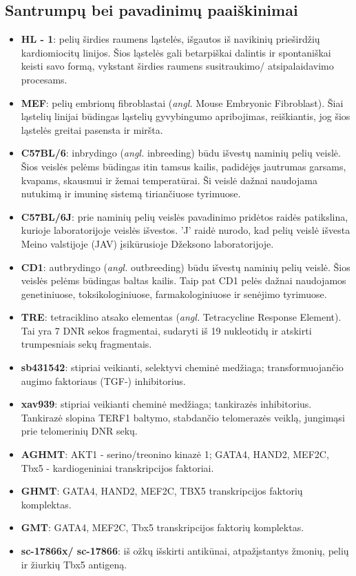 \documentclass[12pt]{article}
\begin{document}
\newpage

\subsection{Santrumpų bei pavadinimų paaiškinimai}
\begin{itemize}
    \item \textbf{HL - 1}: pelių širdies raumens ląstelės, išgautos iš
          navikinių prieširdžių kardiomiocitų linijos. Šios ląstelės gali
          betarpiškai dalintis ir spontaniškai keisti savo formą, vykstant
          širdies raumens susitraukimo/ atsipalaidavimo procesams.
    \item \textbf{MEF}: pelių embrionų fibroblastai (\emph{angl.} Mouse
          Embryonic Fibroblast). Šiai ląstelių linijai būdingas ląstelių
          gyvybingumo apribojimas, reiškiantis, jog šios ląstelės greitai
          pasensta ir miršta.
    \item \textbf{C57BL/6}: inbrydingo (\emph{angl.} inbreeding) būdu išvestų
          naminių pelių veislė. Šios veislės pelėms būdingas itin tamsus
          kailis, padidėjęs jautrumas garsams, kvapams, skausmui ir žemai
          temperatūrai. Ši veislė dažnai naudojama nutukimą ir imuninę sistemą
          tiriančiuose tyrimuose.
    \item \textbf{C57BL/6J}: prie naminių pelių veislės pavadinimo pridėtos
          raidės patikslina, kurioje laboratorijoje veislės išvestos. 'J' raidė
          nurodo, kad pelių veislė išvesta Meino valstijoje (JAV) įsikūrusioje
          Džeksono laboratorijoje\cite{JCKSLAB}.
    \item \textbf{CD1}: autbrydingo (\emph{angl.} outbreeding) būdu išvestų
          naminių pelių veislė. Šios veislės pelėms būdingas baltas kailis.
          Taip pat CD1 pelės dažnai naudojamos genetiniuose, toksikologiniuose,
          farmakologiniuose ir senėjimo tyrimuose.
    \item \textbf{TRE}: tetraciklino atsako elementas (\emph{angl.} 
          Tetracycline Response Element). Tai yra 7 DNR sekos fragmentai,
          sudaryti iš 19 nukleotidų ir atskirti trumpesniais sekų fragmentais.
    \item \textbf{sb431542}: stipriai veikianti, selektyvi cheminė medžiaga;
          transformuojančio augimo faktoriaus {\textbeta} (TGF-{\textbeta})
          inhibitorius.
    \item \textbf{xav939}: stipriai veikianti cheminė medžiaga; tankirazės
          inhibitorius. Tankirazė slopina TERF1 baltymo, stabdančio
          telomerazės veiklą, jungimąsi prie telomerinių DNR sekų.
    \item \textbf{AGHMT}: AKT1 - serino/treonino kinazė 1; GATA4, HAND2, MEF2C,
          Tbx5 - kardiogeniniai transkripcijos faktoriai.
    \item \textbf{GHMT}: GATA4, HAND2, MEF2C, TBX5 transkripcijos faktorių
          komplektas.
    \item \textbf{GMT}: GATA4, MEF2C, Tbx5 transkripcijos faktorių komplektas.
    \item \textbf{sc-17866x/ sc-17866}: iš ožkų išskirti antikūnai,
          atpažįstantys žmonių, pelių ir žiurkių Tbx5 antigeną.
\end{itemize}
\end{document}
